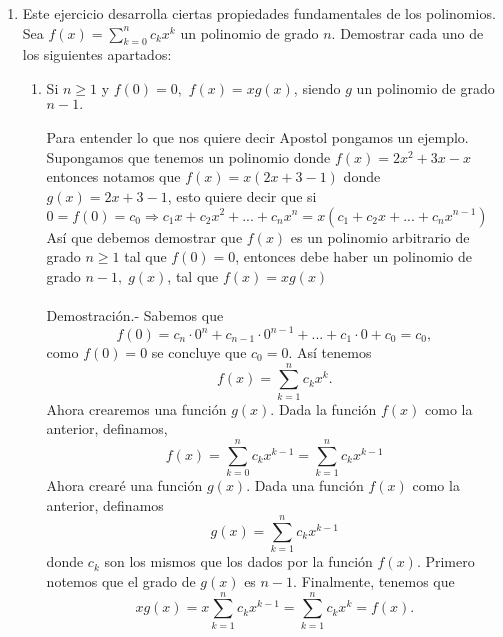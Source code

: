 \begin{enumerate}
        \item Este ejercicio desarrolla ciertas propiedades fundamentales de los polinomios. Sea $f(x)=\displaystyle\sum_{k=0}^{n} c_k x^k$ un polinomio de grado $n$. Demostrar cada uno de los siguientes apartados:
            \begin{enumerate}[\bfseries (a)]
                \item Si $n \geq 1$ \; y \; $f(0)=0,$ $f(x)=xg(x)$, siendo $g$ un polinomio de grado $n-1.$\\\\
                Para entender lo que nos quiere decir Apostol pongamos un ejemplo. Supongamos que tenemos un polinomio donde $f(x)=2x^2+3x-x$ entonces notamos que $f(x)=x(2x+3-1)$ donde $g(x)=2x+3-1$, esto quiere decir que si $0 = f(0)=c_0 \Rightarrow c_1 x + c_2 x^2 + ... + c_n x^n = x(c_1 + c_2 x + ... + c_n x^{n-1})$ 
                Así que debemos demostrar que $f(x)$ es un polinomio arbitrario de grado $n \geq 1$ tal que $f(0)=0$, entonces debe haber un polinomio de grado $n-1, \; g(x)$, tal que $f(x)=xg(x)$\\\\
                Demostración.- \; Sabemos que $$f(0) = c_n \cdot 0^n + c_{n-1} \cdot 0^{n-1} + ... + c_1 \cdot 0 + c_0 =c_0,$$ como $f(0)=0$ se concluye que $c_0=0$. Así tenemos $$f(x)=\displaystyle\sum_{k=1}^{n} c_k x^k.$$ Ahora crearemos una función $g(x).$ Dada la función $f(x)$ como la anterior, definamos, $$f(x)=\displaystyle\sum_{k=0}^{n} c_k x^{k-1} = \sum_{k=1}^{n} c_k x^{k-1}$$ 
                Ahora crearé una función $g(x)$. Dada una función $f(x)$ como la anterior, definamos  $$g(x) = \displaystyle\sum_{k=1}^{n} c_k x^{k-1}$$
                donde $c_k$ son los mismos que los dados por la función $f(x)$. Primero notemos que el grado de $g(x)$ es $n-1$. Finalmente, tenemos que $$ xg(x) = x \displaystyle\sum_{k=1}^{n} c_k x^{k-1} = \sum_{k=1}^{n} c_k x^k = f(x).$$ \\\\


\end{enumerate}
\end{enumerate}

